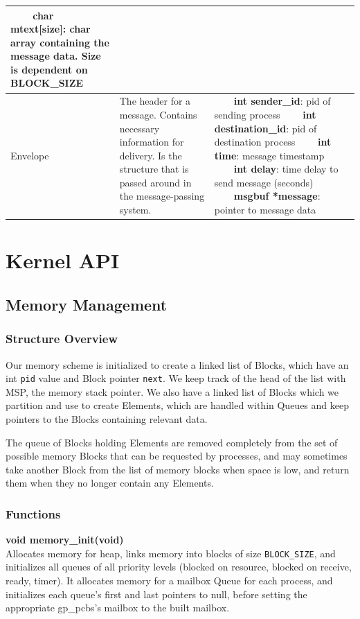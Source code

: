 \documentclass[11pt, oneside]{article}
\newcommand{\tabitem}{~~\llap{\textbullet}~~}
\begin{document}
\begin{description}
\begin{longtable}{|L{2cm}|L{5cm}|L{8cm}|}
\tabitem \textbf{char mtext[size]}: char array containing the message data. Size is dependent on BLOCK\_SIZE\\ \hline
Envelope&The header for a message. Contains necessary information for delivery. Is the structure that is passed around in the message-passing system.&
\tabitem \textbf{int sender\_id}: pid of sending process \newline
\tabitem \textbf{int destination\_id}: pid of destination process \newline
\tabitem \textbf{int time}: message timestamp \newline
\tabitem \textbf{int delay}: time delay to send message (seconds) \newline
\tabitem \textbf{msgbuf *message}: pointer to message data \newline
\\ \hline

\end{longtable}

\end{description}

\clearpage
\section{Kernel API}
\subsection{Memory Management}
\subsubsection{Structure Overview}
Our memory scheme is initialized to create a linked list of Blocks, which have an int {\tt pid} value and Block pointer {\tt next}. We keep track of the head of the list with MSP, the memory stack pointer. We also have a linked list of Blocks which we partition and use to create Elements, which are handled within Queues and keep pointers to the Blocks containing relevant data.

The queue of Blocks holding Elements are removed completely from the set of possible memory Blocks that can be requested by processes, and may sometimes take another Block from the list of memory blocks when space is low, and return them when they no longer contain any Elements.

\subsubsection{Functions}
{\bf void memory\_init(void)}\\
Allocates memory for heap, links memory into blocks of size {\tt BLOCK\_SIZE}, and initializes all queues of all priority levels (blocked on resource, blocked on receive, ready, timer). It allocates memory for a mailbox Queue for each process, and initializes each queue's first and last pointers to null, before setting the appropriate gp\_pcbs's mailbox to the built mailbox.
\end{document}
